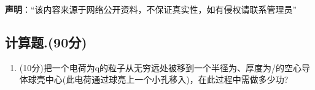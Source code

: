 
\textbf{声明}：“该内容来源于网络公开资料，不保证真实性，如有侵权请联系管理员”

\subsection{计算题.(90分)}
\begin{enumerate}
\item (10分)把一个电荷为q的粒子从无穷远处被移到一个半径为、厚度为/的空心导体球壳中心(此电荷通过球亮上一个小孔移入)，在此过程中需做多少功?
\end{enumerate}